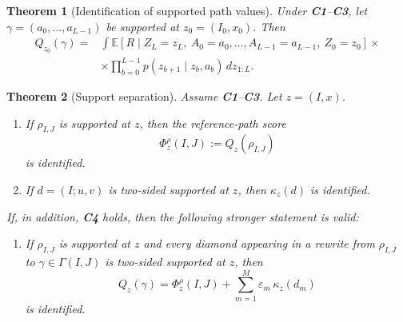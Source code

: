 \documentclass{article}
\newtheorem{theorem}{Theorem}[section]
\theoremstyle{definition}
\newcommand{\EE}{\mathbb E}
\begin{document}
\begin{theorem}[Identification of supported path values]
\label{thm:gformula-main}
Under \textbf{C1}--\textbf{C3}, let
$
\gamma=(a_0,\dots,a_{L-1})
$
be supported at \(z_0=(I_0,x_0)\). Then
\begin{align}
\textstyle Q_{z_0}(\gamma)
=
&\textstyle \int
\EE\!\left[
R
\mid
Z_L=z_L,\ A_0=a_0,\dots,A_{L-1}=a_{L-1},\ Z_0=z_0
\right] \times\\
&\textstyle \times
\prod_{b=0}^{L-1} p(z_{b+1}\mid z_b,a_b)\,dz_{1:L}.
\label{eq:gformula-supported-path}
\end{align}
\end{theorem}

\begin{theorem}[Support separation]
\label{thm:support-separation-main}
Assume \textbf{C1}--\textbf{C3}. Let \(z=(I,x)\).
\begin{enumerate}
    \item If \(\rho_{I,J}\) is supported at \(z\), then the reference-path score
    \begin{equation}
    \textstyle \Phi_z^\rho(I,J):=Q_z(\rho_{I,J})
    \label{eq:identified-reference-score}
    \end{equation}
    is identified.

    \item If \(d=(I;u,v)\) is two-sided supported at \(z\), then \(\kappa_z(d)\) is identified.
\end{enumerate}
If, in addition, \textbf{C4} holds, then the following stronger statement is valid:
\begin{enumerate}[resume]
    \item If \(\rho_{I,J}\) is supported at \(z\) and every diamond appearing in a rewrite from \(\rho_{I,J}\) to \(\gamma\in\Gamma(I,J)\) is two-sided supported at \(z\), then
    \begin{equation}
    \textstyle Q_z(\gamma)
    =
    \Phi_z^\rho(I,J)
    +
    \sum_{m=1}^M \varepsilon_m\,\kappa_z(d_m)
    \label{eq:identified-full-decomposition}
    \end{equation}
    is identified.
\end{enumerate}
\end{theorem}

\begin{center}
\end{center}
\end{document}

